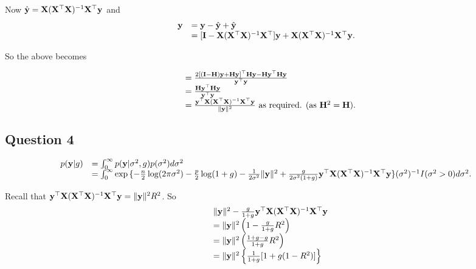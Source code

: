 \documentclass{amsart}[12pt]
\begin{document}
Now $\hat{{\bf y}} = {\bf X} ({\bf X}^\top {\bf X})^{-1} {\bf X}^\top {\bf y}$ and
\begin{equation*}
	\begin{array}{ll}
		{\bf y} & = {\bf y} - \hat{{\bf y}} + \hat{{\bf y}}                                                          \\
		    & = [{\bf I} - {\bf X} ({\bf X}^\top {\bf X})^{-1} {\bf X}^\top] {\bf y} + {\bf X} ({\bf X}^\top {\bf X})^{-1} {\bf X}^\top {\bf y}. 
	\end{array}
\end{equation*}

So the above becomes

\begin{equation*}
	\begin{array}{ll}
		  & = \frac{2[({\bf I} - {\bf H}) {\bf y} + {\bf H} {\bf y}]^\top {\bf H} {\bf y} - {\bf H} {\bf y}^\top {\bf H} {\bf y}}{{\bf y}^\top {\bf y}}                             \\
		  & = \frac{{\bf H} {\bf y}^\top {\bf H} {\bf y}}{{\bf y}^\top {\bf y}}                                                                         \\
		  & = \frac{{\bf y}^\top {\bf X} ({\bf X}^\top {\bf X})^{-1} {\bf X}^\top {\bf y}}{\| {\bf y} \|^2} \text{ as required. } (\text{as } {\bf H}^2 = {\bf H}). 
	\end{array}
\end{equation*}

\subsection{Question 4}
\begin{equation*}
	\begin{array}{ll}
		p({\bf y} | g) & = \int_0^\infty p({\bf y} | \sigma^2, g) p(\sigma^2) d \sigma^2                          \\
		           & = \int_0^\infty \exp{\{ -\frac{n}{2} \log (2 \pi \sigma^2) - \frac{p}{2} \log(1 + g) 
		- \frac{1}{2 \sigma^2} \| {\bf y}\|^2
		+ \frac{g}{2 \sigma^2 (1 + g)} {\bf y}^\top {\bf X}({\bf X}^\top {\bf X})^{-1} {\bf X}^\top {\bf y}\}}
		(\sigma^2)^{-1} I(\sigma^2 > 0) d \sigma^2.
	\end{array}
\end{equation*}

Recall that ${\bf y}^\top {\bf X}({\bf X}^\top {\bf X})^{-1} {\bf X}^\top {\bf y} = \| {\bf y} \|^2 R^2$. So
\begin{equation*}
	\begin{array}{ll}
		  & \| {\bf y} \|^2 -\frac{g}{1 + g} {\bf y}^\top {\bf X} ({\bf X}^\top {\bf X})^{-1} {\bf X}^\top {\bf y} \\
		  & = \| {\bf y} \|^2 \left(1 - \frac{g}{1 + g}R^2 \right)                         \\
		  & = \| {\bf y} \|^2 \left(\frac{1 + g - g}{1 + g} R^2 \right)                    \\
		  & = \| {\bf y} \|^2 \left\{ \frac{1}{1 + g} [ 1 + g(1 - R^2) ] \right\}          
	\end{array}
\end{equation*}
\end{document}
